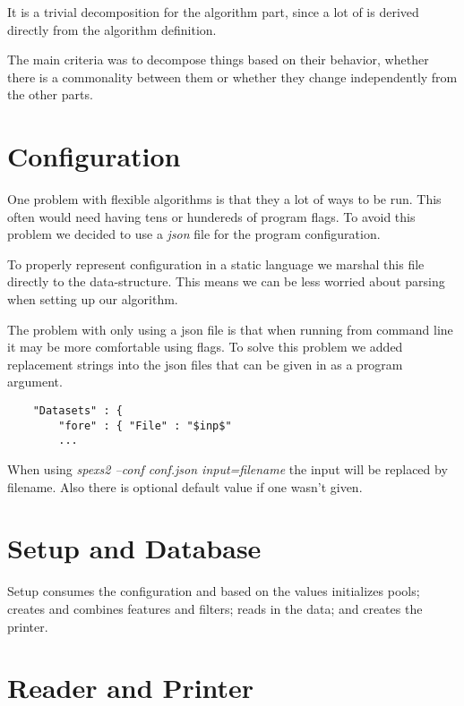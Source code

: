 It is a trivial decomposition for the algorithm part, since a lot of is derived 
directly from the algorithm definition.

The main criteria was to decompose things based on their behavior, whether there
is a commonality between them or whether they change independently from the other
parts. \cite{Parnas72}

\section{Configuration}

One problem with flexible algorithms is that they a lot of ways to be run.
This often would need having tens or hundereds of program flags.
To avoid this problem we decided to use a \emph{json} file for the program
configuration.


To properly represent configuration in a static language we
marshal this file directly to the data-structure. This means we can be
less worried about parsing when setting up our algorithm.

The problem with only using a json file is that when running from
command line it may be more comfortable using flags. To solve this problem
we added replacement strings into the json files that can be given in as
a program argument.

\begin{verbatim}
    "Datasets" : {
        "fore" : { "File" : "$inp$"
        ...
\end{verbatim}

When using \emph{spexs2 --conf conf.json input=filename} the input will be
replaced by filename. Also there is optional default value if one wasn't given.

\section{Setup and Database}

Setup consumes the configuration and based on the values initializes pools; 
creates and combines features and filters; reads in the data; and creates
the printer.


\section{Reader and Printer}

